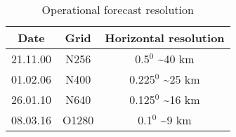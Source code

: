 \begin{table}%
	\caption{Operational forecast resolution}\label{t_ecmwf2}
	\begin{tabular}{ ccc }
		\hline\hline
		Date & Grid & Horizontal resolution \\
		\hline\hline
		21.11.00 & N256 & 0.5$^0$ \textasciitilde{40} km \\ %
		01.02.06 & N400 & 0.225$^0$ \textasciitilde{25} km \\ %
		26.01.10 & N640 & 0.125$^0$ \textasciitilde{16} km \\ %
		08.03.16 & O1280 & 0.1$^0$ \textasciitilde{9} km \\ %
		\hline
	\end{tabular}
\end{table}

